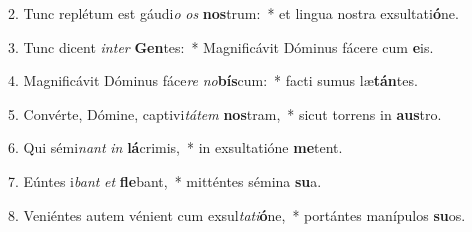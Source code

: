 2. Tunc replétum est gáudi\textit{o} \textit{os} \textbf{nos}trum:~*  et lingua nostra exsultati\textbf{ó}ne.\

3. Tunc dicent \textit{in}\textit{ter} \textbf{Gen}tes:~*  Magnificávit Dóminus fácere cum \textbf{e}is.\

4. Magnificávit Dóminus fáce\textit{re} \textit{no}\textbf{bís}cum:~*  facti sumus læ\textbf{tán}tes.\

5. Convérte, Dómine, captivi\textit{tá}\textit{tem} \textbf{nos}tram,~*  sicut torrens in \textbf{aus}tro.\

6. Qui sémi\textit{nant} \textit{in} \textbf{lá}crimis,~*  in exsultatióne \textbf{me}tent.\

7. Eúntes i\textit{bant} \textit{et} \textbf{fle}bant,~*  mitténtes sémina \textbf{su}a.\

8. Veniéntes autem vénient cum exsul\textit{ta}\textit{ti}\textbf{ó}ne,~*  portántes manípulos \textbf{su}os.\

